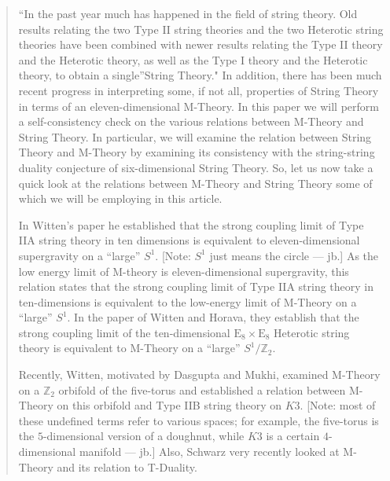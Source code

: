 \documentclass{article}
\begin{document}
\begin{quote}
``In the past year much has happened in the field of string theory. Old
results relating the two Type II string theories and the two Heterotic
string theories have been combined with newer results relating the Type
II theory and the Heterotic theory, as well as the Type I theory and the
Heterotic theory, to obtain a single''String Theory." In addition, there
has been much recent progress in interpreting some, if not all,
properties of String Theory in terms of an eleven-dimensional M-Theory.
In this paper we will perform a self-consistency check on the various
relations between M-Theory and String Theory. In particular, we will
examine the relation between String Theory and M-Theory by examining its
consistency with the string-string duality conjecture of six-dimensional
String Theory. So, let us now take a quick look at the relations between
M-Theory and String Theory some of which we will be employing in this
article.

In Witten's paper he established that the strong coupling limit of Type
IIA string theory in ten dimensions is equivalent to eleven-dimensional
supergravity on a ``large'' \(S^1\). {[}Note: \(S^1\) just means the
circle --- jb.{]} As the low energy limit of M-theory is
eleven-dimensional supergravity, this relation states that the strong
coupling limit of Type IIA string theory in ten-dimensions is equivalent
to the low-energy limit of M-Theory on a ``large'' \(S^1\). In the paper
of Witten and Horava, they establish that the strong coupling limit of
the ten-dimensional \(\mathrm{E}_8 \times \mathrm{E}_8\) Heterotic
string theory is equivalent to M-Theory on a ``large''
\(S^1/\mathbb{Z}_2\).

Recently, Witten, motivated by Dasgupta and Mukhi, examined M-Theory on
a \(\mathbb{Z}_2\) orbifold of the five-torus and established a relation
between M-Theory on this orbifold and Type IIB string theory on \(K3\).
{[}Note: most of these undefined terms refer to various spaces; for
example, the five-torus is the \(5\)-dimensional version of a doughnut,
while \(K3\) is a certain \(4\)-dimensional manifold --- jb.{]} Also,
Schwarz very recently looked at M-Theory and its relation to T-Duality.


\end{quote}
\end{document}
